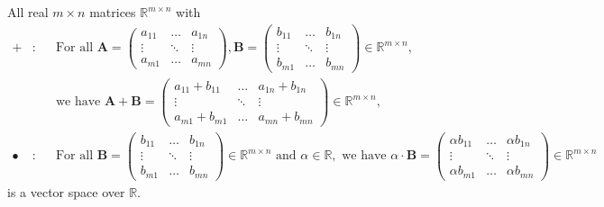 \documentclass{huhtakm-template-book-v2}
\begin{document}
    \begin{eg}
        All real $m \times n$ matrices $\mathbb{R}^{m \times n}$ with
        \begin{align*}
            +&: & &\text{For all } \mathbf{A} = \begin{pmatrix}
                a_{11} & \hdots & a_{1n}\\
                \vdots & \ddots & \vdots\\
                a_{m1} & \hdots & a_{mn}
            \end{pmatrix}, \mathbf{B} = \begin{pmatrix}
                b_{11} & \hdots & b_{1n}\\
                \vdots & \ddots & \vdots\\
                b_{m1} & \hdots & b_{mn}
            \end{pmatrix} \in \mathbb{R}^{m \times n},\\
            & & &\text{we have } \mathbf{A} + \mathbf{B} = \begin{pmatrix}
                a_{11} + b_{11} & \hdots & a_{1n} + b_{1n}\\
                \vdots & \ddots & \vdots\\
                a_{m1} + b_{m1} & \hdots & a_{mn} + b_{mn}
            \end{pmatrix} \in \mathbb{R}^{m \times n},\\
            \bullet&: & &\text{For all } \mathbf{B} = \begin{pmatrix}
                b_{11} & \hdots & b_{1n}\\
                \vdots & \ddots & \vdots\\
                b_{m1} & \hdots & b_{mn}
            \end{pmatrix} \in \mathbb{R}^{m \times n} \text{ and } \alpha \in \mathbb{R}, \text{ we have } \alpha \cdot \mathbf{B} = \begin{pmatrix}
                \alpha b_{11} & \hdots & \alpha b_{1n}\\
                \vdots & \ddots & \vdots\\
                \alpha b_{m1} & \hdots & \alpha b_{mn}
            \end{pmatrix} \in \mathbb{R}^{m \times n}
        \end{align*}
        is a vector space over $\mathbb{R}$.
    \end{eg}
\end{document}

